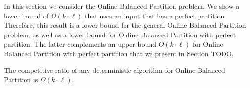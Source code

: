 
In this section we consider the Online Balanced Partition problem.
We show a lower bound of $\Omega(k \cdot \ell)$ that uses an input that has a perfect partition.
Therefore, this result is a lower bound for the general Online Balanced Partition problem, as well as a lower bound for Online Balanced Partition with perfect partition.
The latter complements an upper bound $O(k \cdot \ell)$ for Online Balanced Partition with perfect partition that we present in Section TODO.

\begin{theorem}
  The competitive ratio of any deterministic algorithm for Online Balanced Partition is $\Omega(k\cdot \ell)$.
\end{theorem}


